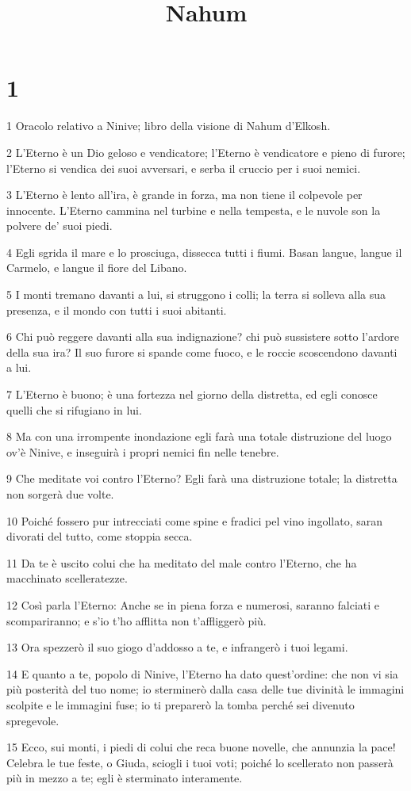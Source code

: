 

\title{Nahum}


\chapter{1}

\par 1 Oracolo relativo a Ninive; libro della visione di Nahum d'Elkosh.
\par 2 L'Eterno è un Dio geloso e vendicatore; l'Eterno è vendicatore e pieno di furore; l'Eterno si vendica dei suoi avversari, e serba il cruccio per i suoi nemici.
\par 3 L'Eterno è lento all'ira, è grande in forza, ma non tiene il colpevole per innocente. L'Eterno cammina nel turbine e nella tempesta, e le nuvole son la polvere de' suoi piedi.
\par 4 Egli sgrida il mare e lo prosciuga, dissecca tutti i fiumi. Basan langue, langue il Carmelo, e langue il fiore del Libano.
\par 5 I monti tremano davanti a lui, si struggono i colli; la terra si solleva alla sua presenza, e il mondo con tutti i suoi abitanti.
\par 6 Chi può reggere davanti alla sua indignazione? chi può sussistere sotto l'ardore della sua ira? Il suo furore si spande come fuoco, e le roccie scoscendono davanti a lui.
\par 7 L'Eterno è buono; è una fortezza nel giorno della distretta, ed egli conosce quelli che si rifugiano in lui.
\par 8 Ma con una irrompente inondazione egli farà una totale distruzione del luogo ov'è Ninive, e inseguirà i propri nemici fin nelle tenebre.
\par 9 Che meditate voi contro l'Eterno? Egli farà una distruzione totale; la distretta non sorgerà due volte.
\par 10 Poiché fossero pur intrecciati come spine e fradici pel vino ingollato, saran divorati del tutto, come stoppia secca.
\par 11 Da te è uscito colui che ha meditato del male contro l'Eterno, che ha macchinato scelleratezze.
\par 12 Così parla l'Eterno: Anche se in piena forza e numerosi, saranno falciati e scompariranno; e s'io t'ho afflitta non t'affliggerò più.
\par 13 Ora spezzerò il suo giogo d'addosso a te, e infrangerò i tuoi legami.
\par 14 E quanto a te, popolo di Ninive, l'Eterno ha dato quest'ordine: che non vi sia più posterità del tuo nome; io sterminerò dalla casa delle tue divinità le immagini scolpite e le immagini fuse; io ti preparerò la tomba perché sei divenuto spregevole.
\par 15 Ecco, sui monti, i piedi di colui che reca buone novelle, che annunzia la pace! Celebra le tue feste, o Giuda, sciogli i tuoi voti; poiché lo scellerato non passerà più in mezzo a te; egli è sterminato interamente.

